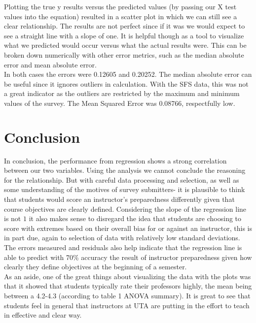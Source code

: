 \documentclass[10pt]{report}
\begin{document}
Plotting the true y results versus the predicted values (by passing our X test values into the equation) resulted in a scatter plot
in which we can still see a clear relationship. The results are not perfect since if it was we would expect to see a straight line
with a slope of one. It is helpful though as a tool to visualize what we predicted would occur versus what the actual results were.
This can be broken down numerically with other error metrics, such as the median absolute error and mean absolute error. \\
In both cases the errors were 0.12605 and 0.20252. The median absolute error can be useful since it ignores outliers in calculation.
With the SFS data, this was not a great indicator as the outliers are restricted by the maximum and minimum values of the survey.
The Mean Squared Error was 0.08766, respectfully low.




\newpage
\section*{Conclusion}

In conclusion, the performance from regression shows a strong correlation between our two variables. Using the analysis we cannot conclude
the reasoning for the relationship. But with careful data processing and selection, as well as some understanding of the motives of survey 
submitters- it is plausible to think that students would score an instructor's preparedness differently given that course objectives are
clearly defined. Considering the slope of the regression line is not $1$ it also makes sense to disregard the idea that students are choosing
to score with extremes based on their overall bias for or against an instructor, this is in part due, again to selection of data with relatively
low standard deviations. The errors measured and residuals also help indicate that the regression line is able to predict with 70\% accuracy the 
result of instructor preparedness given how clearly they define objectives at the beginning of a semester. \\
As an aside, one of the great things about visualizing the data with the plots was that it showed that students typically rate their professors
highly, the mean being between a 4.2-4.3 (according to table 1 ANOVA summary). It is great to see that students feel in general that instructors
at UTA are putting in the effort to teach in effective and clear way.
\end{document}
